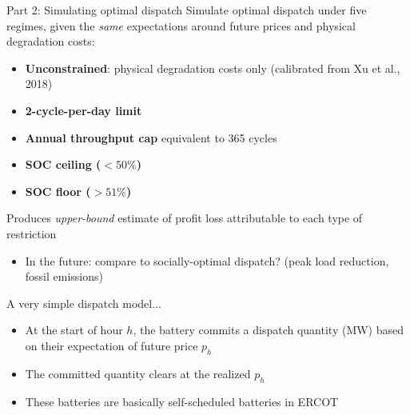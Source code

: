 \documentclass{beamer}
\begin{document}
\begin{frame}{Part 2: Simulating optimal dispatch}
Simulate optimal dispatch under five regimes, given the \textit{same} expectations around future prices and physical degradation costs:
\vspace{0.2cm}
\begin{itemize}
    \item \textbf{Unconstrained}: physical degradation costs only (calibrated from Xu et al., 2018)
    \item \textbf{2-cycle-per-day limit}
    \item \textbf{Annual throughput cap} equivalent to 365 cycles
    \item \textbf{SOC ceiling ($<50\%$)}
    \item \textbf{SOC floor ($>51\%$)}
\end{itemize}

\vspace{0.3cm}
Produces \textit{upper-bound} estimate of profit loss attributable to each type of restriction

\begin{itemize}
    \item In the future: compare to socially-optimal dispatch? (peak load reduction, fossil emissions)
\end{itemize}

\end{frame}




\begin{frame}{A very simple dispatch model...}

\begin{itemize}
    \item At the start of hour $h$, the battery commits a dispatch quantity (MW) based on their expectation of future price $p_h$
    \item The committed quantity clears at the realized $p_h$
    \item These batteries are basically self-scheduled batteries in ERCOT
\end{itemize}
\end{frame}
\end{document}
